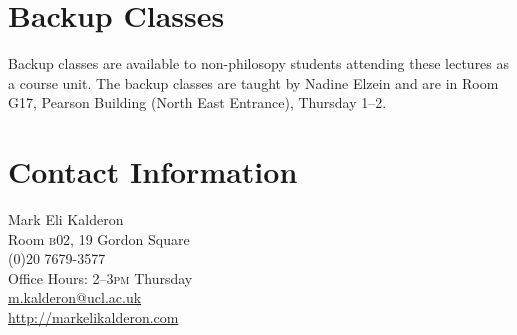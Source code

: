 \documentclass[12pt]{article}
\begin{document}

\section{Backup Classes}\label{sec:backup_classes} %

Backup classes are available to non-philosopy students attending these lectures as a course unit. The backup classes are taught by Nadine Elzein and are in Room G17, Pearson Building (North East Entrance), Thursday 1--2.


\section{Contact Information}\label{sec:contact_information} %

Mark Eli Kalderon\\
Room \textsc{b}02, 19 Gordon Square\\
(0)20 7679-3577\\
Office Hours: 2--3\textsc{pm} Thursday\\
\href{mailto:m.kalderon@ucl.ac.uk}{m.kalderon@ucl.ac.uk}\\
\url{http://markelikalderon.com}



%  
%  
\end{document}
